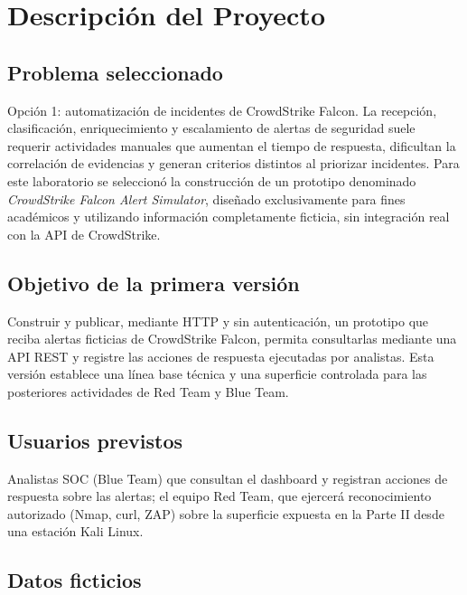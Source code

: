 \documentclass[journal]{IEEEtran}
\begin{document}
\section{Descripción del Proyecto}

\subsection{Problema seleccionado}

Opción 1: automatización de incidentes de CrowdStrike Falcon. La recepción,
clasificación, enriquecimiento y escalamiento de alertas de seguridad suele
requerir actividades manuales que aumentan el tiempo de respuesta, dificultan
la correlación de evidencias y generan criterios distintos al priorizar
incidentes. Para este laboratorio se seleccionó la construcción de un
prototipo denominado \textit{CrowdStrike Falcon Alert Simulator}, diseñado
exclusivamente para fines académicos y utilizando información completamente
ficticia, sin integración real con la API de CrowdStrike.

\subsection{Objetivo de la primera versión}

Construir y publicar, mediante HTTP y sin autenticación, un prototipo que
reciba alertas ficticias de CrowdStrike Falcon, permita consultarlas mediante
una API REST y registre las acciones de respuesta ejecutadas por analistas.
Esta versión establece una línea base técnica y una superficie controlada
para las posteriores actividades de Red Team y Blue Team.

\subsection{Usuarios previstos}

Analistas SOC (Blue Team) que consultan el dashboard y registran acciones de
respuesta sobre las alertas; el equipo Red Team, que ejercerá reconocimiento
autorizado (Nmap, curl, ZAP) sobre la superficie expuesta en la Parte II desde
una estación Kali Linux.

\subsection{Datos ficticios}
\end{document}
